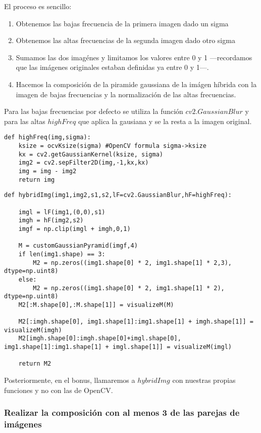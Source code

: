 \documentclass{article}
\begin{document}
El proceso es sencillo:

\begin{enumerate}
\item Obtenemos las bajas frecuencia de la primera imagen dado un sigma
\item Obtenemos las altas frecuencias de la segunda imagen dado otro sigma
\item Sumamos las dos imagénes y limitamos los valores entre 0 y 1 ---recordamos que las imágenes originales estaban definidas ya entre 0 y 1---.
\item Hacemos la composición de la piramide gaussiana de la imágen híbrida con la imagen de bajas frecuencias y la normalización de las altas frecuencias.
\end{enumerate}

Para las bajas frecuencias por defecto se utiliza la función $cv2.GaussianBlur$ y para las altas $highFreq$ que aplica la gausiana y se la resta a la imagen original.

\begin{lstlisting}
def highFreq(img,sigma):
    ksize = ocvKsize(sigma) #OpenCV formula sigma->ksize
    kx = cv2.getGaussianKernel(ksize, sigma)
    img2 = cv2.sepFilter2D(img,-1,kx,kx)
    img = img - img2
    return img

\end{lstlisting}

\begin{lstlisting}    
def hybridImg(img1,img2,s1,s2,lF=cv2.GaussianBlur,hF=highFreq):

    imgl = lF(img1,(0,0),s1)
    imgh = hF(img2,s2)
    imgf = np.clip(imgl + imgh,0,1)

    M = customGaussianPyramid(imgf,4)
    if len(img1.shape) == 3:
        M2 = np.zeros((img1.shape[0] * 2, img1.shape[1] * 2,3), dtype=np.uint8)
    else:
        M2 = np.zeros((img1.shape[0] * 2, img1.shape[1] * 2), dtype=np.uint8)
    M2[:M.shape[0],:M.shape[1]] = visualizeM(M)

    M2[:imgh.shape[0], img1.shape[1]:img1.shape[1] + imgh.shape[1]] = visualizeM(imgh)
    M2[imgh.shape[0]:imgh.shape[0]+imgl.shape[0], img1.shape[1]:img1.shape[1] + imgl.shape[1]] = visualizeM(imgl)

    return M2
\end{lstlisting}

Posteriormente, en el bonus, llamaremos a $hybridImg$ con nuestras propias funciones y no con las de OpenCV.

\subsubsection{Realizar la composición con al menos 3 de las parejas de imágenes}
\end{document}
